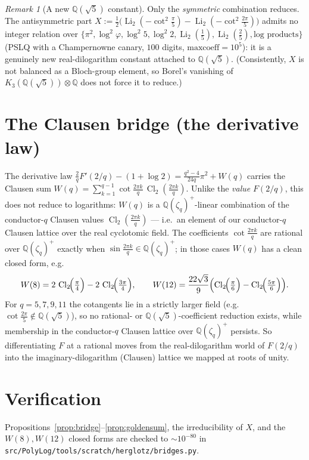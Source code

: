 \documentclass[11pt]{article}
\DeclareMathOperator{\Li}{Li}
\newcommand{\Cl}{\operatorname{Cl}_2}
\theoremstyle{plain}\newtheorem{proposition}{Proposition}
\theoremstyle{remark}\newtheorem{remark}[proposition]{Remark}
\begin{document}
\begin{remark}[A new $\mathbb Q(\sqrt5)$ constant]
Only the \emph{symmetric} combination reduces. The antisymmetric part
$X:=\tfrac12\bigl(\Li_2(-\cot^2\tfrac{\pi}{5})-\Li_2(-\cot^2\tfrac{2\pi}{5})\bigr)$ admits no integer relation
over $\{\pi^2,\log^2\varphi,\log^2 5,\log^2 2,\Li_2(\tfrac15),\Li_2(\tfrac25),\text{log products}\}$ (PSLQ
with a Champernowne canary, $100$ digits, $\mathrm{maxcoeff}=10^5$): it is a genuinely new real-dilogarithm
constant attached to $\mathbb Q(\sqrt5)$. (Consistently, $X$ is not balanced as a Bloch-group element, so
Borel's vanishing of $K_3(\mathbb Q(\sqrt5))\otimes\mathbb Q$ does not force it to reduce.)
\end{remark}

\section{The Clausen bridge (the derivative law)}
The derivative law $\tfrac2q F'(2/q)-(1+\log2)=\tfrac{q^2-4}{24q}\pi^2+W(q)$ carries the Clausen sum
$W(q)=\sum_{k=1}^{q-1}\cot\tfrac{2\pi k}q\,\Cl(\tfrac{2\pi k}q)$. Unlike the \emph{value} $F(2/q)$, this does
not reduce to logarithms: $W(q)$ is a $\mathbb Q(\zeta_q)^+$-linear combination of the conductor-$q$ Clausen
values $\Cl(\tfrac{2\pi k}q)$ --- i.e.\ an element of our conductor-$q$ Clausen lattice over the real
cyclotomic field. The coefficients $\cot\tfrac{2\pi k}q$ are rational over $\mathbb Q(\zeta_q)^+$ exactly when
$\sin\tfrac{2\pi k}q\in\mathbb Q(\zeta_q)^+$; in those cases $W(q)$ has a clean closed form, e.g.
\[
  W(8)=2\,\Cl\!\Bigl(\tfrac{\pi}4\Bigr)-2\,\Cl\!\Bigl(\tfrac{3\pi}4\Bigr),\qquad
  W(12)=\frac{22\sqrt3}{9}\Bigl(\Cl\!\Bigl(\tfrac{\pi}6\Bigr)-\Cl\!\Bigl(\tfrac{5\pi}6\Bigr)\Bigr).
\]
For $q=5,7,9,11$ the cotangents lie in a strictly larger field (e.g.\ $\cot\tfrac{2\pi}5\notin\mathbb Q(\sqrt5)$),
so no rational- or $\mathbb Q(\sqrt5)$-coefficient reduction exists, while membership in the conductor-$q$
Clausen lattice over $\mathbb Q(\zeta_q)^+$ persists. So differentiating $F$ at a rational moves from the
real-dilogarithm world of $F(2/q)$ into the imaginary-dilogarithm (Clausen) lattice we mapped at roots of
unity.

\section*{Verification}
Propositions~\ref{prop:bridge}--\ref{prop:goldensum}, the irreducibility of $X$, and the $W(8),W(12)$
closed forms are checked to $\sim10^{-80}$ in
\texttt{src/PolyLog/tools/scratch/herglotz/bridges.py}.
\end{document}
